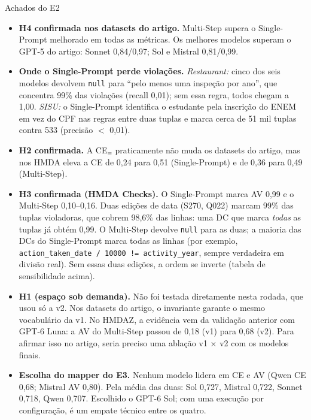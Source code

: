 \documentclass[11pt,a4paper]{article}
\begin{document}
\begin{achado}{Achados do E2}
\begin{itemize}
  \item \textbf{H4 confirmada nos datasets do artigo.} Multi-Step supera o Single-Prompt melhorado em todas as
        métricas. Os melhores modelos superam o GPT-5 do artigo: Sonnet 0,84/0,97; Sol e Mistral 0,81/0,99.
  \item \textbf{Onde o Single-Prompt perde violações.} \emph{Restaurant:} cinco dos seis modelos devolvem
        \texttt{null} para ``pelo menos uma inspeção por ano'', que concentra 99\% das violações (recall
        0,01); sem essa regra, todos chegam a 1,00. \emph{SISU:} o Single-Prompt identifica o estudante pela
        inscrição do ENEM em vez do CPF nas regras entre duas tuplas e marca cerca de 51 mil tuplas contra 533
        (precisão $<$ 0,01).
  \item \textbf{H2 confirmada.} A CE$_\equiv$ praticamente não muda os datasets do artigo, mas nos HMDA eleva a
        CE de 0,24 para 0,51 (Single-Prompt) e de 0,36 para 0,49 (Multi-Step).
  \item \textbf{H3 confirmada (HMDA Checks).} O Single-Prompt marca AV 0,99 e o Multi-Step 0,10--0,16. Duas edições
        de data (S270, Q022) marcam 99\% das tuplas violadoras, que cobrem 98,6\% das linhas: uma DC que marca
        \emph{todas} as tuplas já obtém 0,99. O Multi-Step devolve \texttt{null} para as duas; a maioria das DCs do
        Single-Prompt marca todas as linhas (por exemplo, \texttt{action\_taken\_date / 10000 !=
        activity\_year}, sempre verdadeira em divisão real). Sem essas duas edições, a ordem se inverte (tabela
        de sensibilidade acima).
  \item \textbf{H1 (espaço sob demanda).} Não foi testada diretamente nesta rodada, que usou só a v2. Nos datasets do
        artigo, o invariante garante o mesmo vocabulário da v1. No HMDAZ, a evidência vem da validação anterior
        com GPT-6 Luna: a AV do Multi-Step passou de 0,18 (v1) para 0,68 (v2). Para afirmar isso no artigo, seria
        preciso uma ablação v1 $\times$ v2 com os modelos finais.
  \item \textbf{Escolha do mapper do E3.} Nenhum modelo lidera em CE e AV (Qwen CE 0,68; Mistral AV 0,80). Pela
        média das duas: Sol 0,727, Mistral 0,722, Sonnet 0,718, Qwen 0,707. Escolhido o GPT-6 Sol; com uma
        execução por configuração, é um empate técnico entre os quatro.
\end{itemize}
\end{achado}
\end{document}

